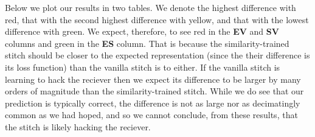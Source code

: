 \documentclass{article}
\begin{document}
Below we plot our results in two tables. We denote the highest difference with red, that with the second highest 
difference with yellow, and that with the lowest difference with green. We expect, therefore, to see red in the
\textbf{EV} and \textbf{SV} columns and green in the \textbf{ES} column. That is because the similarity-trained
stitch should be closer to the expected representation (since the their difference is its loss function) than
the vanilla stitch is to either. If the vanilla stitch is learning to hack the reciever then we expect its
difference to be larger by many orders of magnitude than the similarity-trained stitch. While we do see that
our prediction is typically correct, the difference is not as large nor as decimatingly common as we had hoped,
and so we cannot conclude, from these results, that the stitch is likely hacking the reciever.
\end{document}
